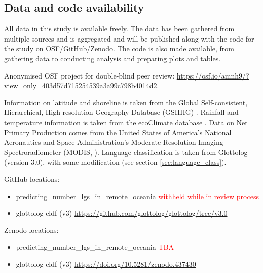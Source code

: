 \documentclass[unnumsec,webpdf,modern,medium]{oup-authoring-template}
\begin{document}
\begin{appendices}


\section{Data and code availability}
\label{supp_data_availability}

All data in this study is available freely. The data has been gathered from multiple sources and is aggregated and will be published along with the code for the study on OSF/GitHub/Zenodo. The code is also made available, from gathering data to conducting analysis and preparing plots and tables. 

Anonymised OSF project for double-blind peer review: \url{https://osf.io/amnh9/?view_only=403d57d715254539a3a99c798b4014d2}.

Information on latitude and shoreline is taken from the Global Self-consistent, Hierarchical, High-resolution Geography Database (GSHHG) \citep{wessel1996global}. Rainfall and temperature information is taken from the ecoClimate database \citep{ecoclimate}. Data on Net Primary Production comes from the  United States of America's National Aeronautics and Space Administration's Moderate Resolution Imaging Spectroradiometer (MODIS, \citet{running2021modis_terra, running2021modis_aqua}). Language classification is taken from Glottolog (version 3.0), with some modification (see section \ref{sec:language_class}).

GitHub locations:
\begin{itemize}
\item predicting\_number\_lgs\_in\_remote\_oceania  \textcolor{red}{withheld while in review process}
\item glottolog-cldf (v3) \url{https://github.com/glottolog/glottolog/tree/v3.0}
\end{itemize}

Zenodo locations:
\begin{itemize}
\item predicting\_number\_lgs\_in\_remote\_oceania  \textcolor{red}{TBA}
\item glottolog-cldf (v3) \url{https://doi.org/10.5281/zenodo.437430}
\end{itemize}


\end{appendices}
\end{document}
